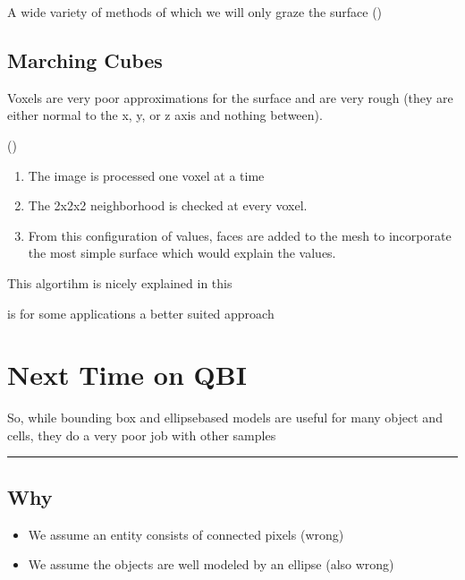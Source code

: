 \documentclass[letterpaper,10pt,english]{sphinxmanual}
\begin{document}
\sphinxAtStartPar
A wide variety of methods of which we will only graze the surface ()


\section{Marching Cubes}
\label{\detokenize{06-ShapeAnalysis:marching-cubes}}
\sphinxAtStartPar
{}

\sphinxAtStartPar
Voxels are very poor approximations for the surface and are very rough (they are either normal to the x, y, or z axis and nothing between).



\sphinxAtStartPar
{} ()
\begin{enumerate}
%
\item {} 
\sphinxAtStartPar
The image is processed one voxel at a time

\item {} 
\sphinxAtStartPar
The 2x2x2 neighborhood is checked at every voxel.

\item {} 
\sphinxAtStartPar
From this configuration of values, faces are added to the mesh to incorporate the most simple surface which would explain the values.

\end{enumerate}

\sphinxAtStartPar
This algortihm is nicely explained in this 

\sphinxAtStartPar
{} is for some applications a better suited approach


\chapter{Next Time on QBI}
\label{\detokenize{06-ShapeAnalysis:next-time-on-qbi}}
\sphinxAtStartPar
So, while bounding box and ellipse\sphinxhyphen{}based models are useful for many object and cells, they do a very poor job with other samples


\bigskip\hrule\bigskip



\section{Why}
\label{\detokenize{06-ShapeAnalysis:why}}\begin{itemize}
\item {} 
\sphinxAtStartPar
We assume an entity consists of connected pixels (wrong)

\item {} 
\sphinxAtStartPar
We assume the objects are well modeled by an ellipse (also wrong)

\end{itemize}
\end{document}
